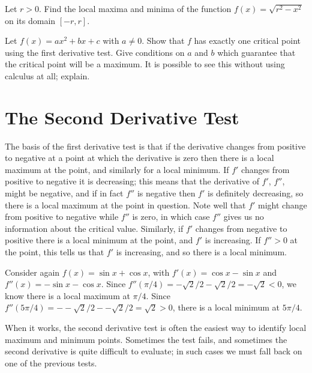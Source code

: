 \begin{exercises}
\begin{exercise} Let $r>0$. Find the local
maxima and minima of the function $f(x)
=\sqrt{r^2 -x^2 }$ on its domain $[-r,r]$.
\end{exercise}

\begin{exercise} Let $f(x) =a x^2 + bx + c$ with $a\neq 0$. Show that $f$
has exactly one critical point using the first derivative test. Give
conditions on $a$ and $b$ which guarantee that the critical point will
be a maximum. It is possible to see this without using calculus at
all; explain.
\end{exercise}

\end{exercises}





\section{The Second Derivative Test}

The basis of the first derivative test is that if the derivative
changes from positive to negative at a point at which the derivative
is zero then there is a local maximum at the point, and similarly for
a local minimum. If $f'$ changes from positive to negative it is
decreasing; this means that the derivative of $f'$, $f''$, might be negative,
and if in fact $f''$ is negative then $f'$ is definitely
decreasing, so there is a local maximum at the point in question. Note
well that $f'$ might change from positive to negative while $f''$ is
zero, in which case $f''$ gives us no information about the critical
value. Similarly, if $f'$ changes from negative to positive there is a
local minimum at the point, and $f'$ is increasing. If $f''>0$ at the
point, this tells us that $f'$ is increasing, and so there is a local
minimum. 

\begin{example}
Consider again $f(x)=\sin x + \cos x$, with $f'(x)=\cos x-\sin x$ and
$ f''(x)=-\sin x -\cos x$. Since $f''(\pi/4)=-\sqrt{2}/2-\sqrt2/2=-\sqrt2<0$,
we know there is a local maximum at $\pi/4$. Since
$f''(5\pi/4)=--\sqrt{2}/2--\sqrt2/2=\sqrt2>0$, there is a local
minimum at $5\pi/4$.
\end{example}

When it works, the second derivative test is often the easiest way to
identify local maximum and minimum points. Sometimes the test fails,
and sometimes the second derivative is quite difficult to evaluate; in
such cases we must fall back on one of the previous tests.

